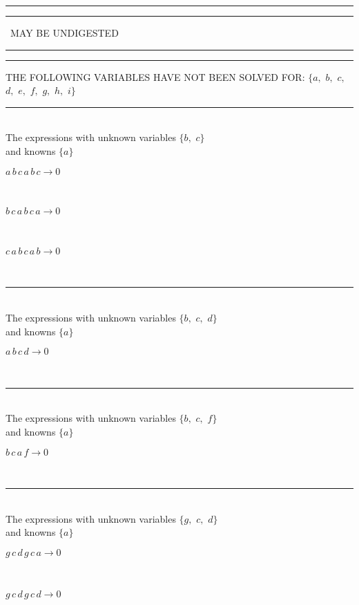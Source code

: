 \rule[2pt]{1.45in}{4pt}\hfil\break
\rule[2pt]{2.18in}{4pt}
\ MAY BE UNDIGESTED\ 
\rule[2pt]{2.18in}{4pt}\hfil\break
\rule[2pt]{6in}{4pt}\hfil\break
THE FOLLOWING VARIABLES HAVE NOT BEEN SOLVED FOR:\hfil\break
$\{a,
$ $
b,
$ $
c,
$ $
d,
$ $
e,
$ $
f,
$ $
g,
$ $
h,
$ $
i\}$
\smallskip\\
\rule[3pt]{6in}{.7pt}\\
The expressions with unknown variables $\{b,
$ $
c\}$\\
and knowns $\{a\}$\smallskip\\
\begin{minipage}{6in}
$
a\,
 b\,
 c\,
 a\,
 b\,
 c\rightarrow 0
$
\end{minipage}\medskip \\
\begin{minipage}{6in}
$
b\,
 c\,
 a\,
 b\,
 c\,
 a\rightarrow 0
$
\end{minipage}\medskip \\
\begin{minipage}{6in}
$
c\,
 a\,
 b\,
 c\,
 a\,
 b\rightarrow 0
$
\end{minipage}\\
\rule[3pt]{6in}{.7pt}\\
The expressions with unknown variables $\{b,
$ $
c,
$ $
d\}$\\
and knowns $\{a\}$\smallskip\\
\begin{minipage}{6in}
$
a\,
 b\,
 c\,
 d\rightarrow 0
$
\end{minipage}\\
\rule[3pt]{6in}{.7pt}\\
The expressions with unknown variables $\{b,
$ $
c,
$ $
f\}$\\
and knowns $\{a\}$\smallskip\\
\begin{minipage}{6in}
$
b\,
 c\,
 a\,
 f\rightarrow 0
$
\end{minipage}\\
\rule[3pt]{6in}{.7pt}\\
The expressions with unknown variables $\{g,
$ $
c,
$ $
d\}$\\
and knowns $\{a\}$\smallskip\\
\begin{minipage}{6in}
$
g\,
 c\,
 d\,
 g\,
 c\,
 a\rightarrow 0
$
\end{minipage}\medskip \\
\begin{minipage}{6in}
$
g\,
 c\,
 d\,
 g\,
 c\,
 d\rightarrow 0
$
\end{minipage}\\
